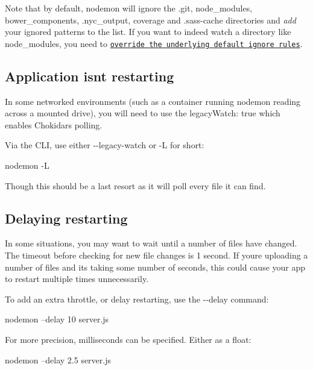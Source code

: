 Note that by default, nodemon will ignore the {\ttfamily .git}, {\ttfamily node\+\_\+modules}, {\ttfamily bower\+\_\+components}, {\ttfamily .nyc\+\_\+output}, {\ttfamily coverage} and {\ttfamily .sass-\/cache} directories and {\itshape add} your ignored patterns to the list. If you want to indeed watch a directory like {\ttfamily node\+\_\+modules}, you need to \href{https://github.com/remy/nodemon/blob/master/faq.md#overriding-the-underlying-default-ignore-rules}{\tt override the underlying default ignore rules}.

\subsection*{Application isn\textquotesingle{}t restarting}

In some networked environments (such as a container running nodemon reading across a mounted drive), you will need to use the {\ttfamily legacy\+Watch\+: true} which enables Chokidar\textquotesingle{}s polling.

Via the C\+LI, use either {\ttfamily -\/-\/legacy-\/watch} or {\ttfamily -\/L} for short\+:


\begin{DoxyCode}
nodemon -L
\end{DoxyCode}


Though this should be a last resort as it will poll every file it can find.

\subsection*{Delaying restarting}

In some situations, you may want to wait until a number of files have changed. The timeout before checking for new file changes is 1 second. If you\textquotesingle{}re uploading a number of files and it\textquotesingle{}s taking some number of seconds, this could cause your app to restart multiple times unnecessarily.

To add an extra throttle, or delay restarting, use the {\ttfamily -\/-\/delay} command\+:


\begin{DoxyCode}
nodemon --delay 10 server.js
\end{DoxyCode}


For more precision, milliseconds can be specified. Either as a float\+:


\begin{DoxyCode}
nodemon --delay 2.5 server.js
\end{DoxyCode}



